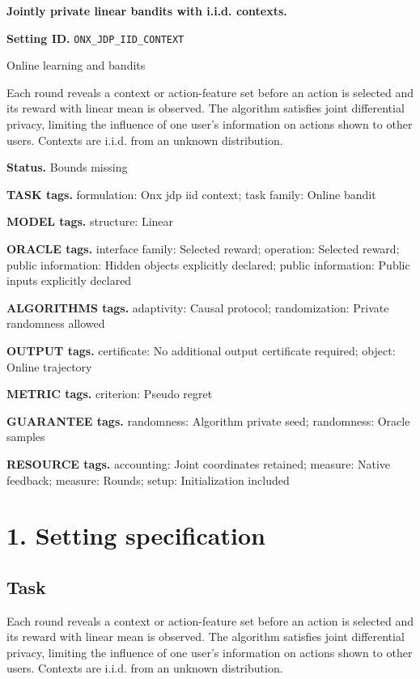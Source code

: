 \documentclass[10pt,a4paper]{article}
\begin{document}
\raggedright

{\LARGE\bfseries\sffamily\color{AtlasNavy} Jointly private linear bandits with i.i.d. contexts.\par}\vspace{5pt}
\textbf{Setting ID.} \texttt{ONX\_\allowbreak{}JDP\_\allowbreak{}IID\_\allowbreak{}CONTEXT}

Online learning and bandits

Each round reveals a context or action-feature set before an action is selected and its reward with linear mean is observed. The algorithm satisfies joint differential privacy, limiting the influence of one user's information on actions shown to other users. Contexts are i.i.d. from an unknown distribution.

\textbf{Status.} Bounds missing

\textbf{TASK tags.} formulation: Onx jdp iid context; task family: Online bandit

\textbf{MODEL tags.} structure: Linear

\textbf{ORACLE tags.} interface family: Selected reward; operation: Selected reward; public information: Hidden objects explicitly declared; public information: Public inputs explicitly declared

\textbf{ALGORITHMS tags.} adaptivity: Causal protocol; randomization: Private randomness allowed

\textbf{OUTPUT tags.} certificate: No additional output certificate required; object: Online trajectory

\textbf{METRIC tags.} criterion: Pseudo regret

\textbf{GUARANTEE tags.} randomness: Algorithm private seed; randomness: Oracle samples

\textbf{RESOURCE tags.} accounting: Joint coordinates retained; measure: Native feedback; measure: Rounds; setup: Initialization included

\section{1. Setting specification}
\subsection{Task}
Each round reveals a context or action-feature set before an action is selected and its reward with linear mean is observed. The algorithm satisfies joint differential privacy, limiting the influence of one user's information on actions shown to other users. Contexts are i.i.d. from an unknown distribution.
\end{document}
